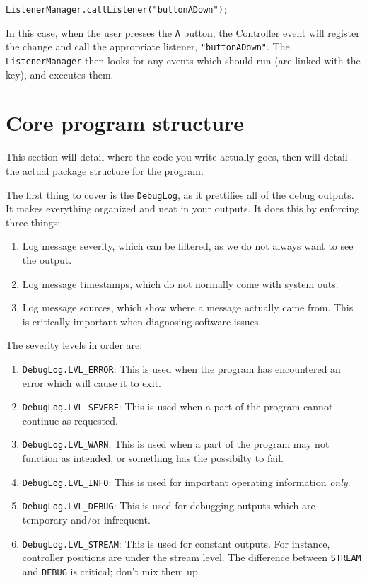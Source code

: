 \documentclass[a4paper]{article}
\begin{document}
\begin{lstlisting}
ListenerManager.callListener("buttonADown");
\end{lstlisting}

In this case, when the user presses the \lstinline{A} button, the Controller event will register the change and call the appropriate listener, \lstinline{"buttonADown"}. The \lstinline{ListenerManager} then looks for any events which should run (are linked with the key), and executes them.


\section{Core program structure}
This section will detail where the code you write actually goes, then will detail the actual package structure for the program.\newline

The first thing to cover is the \lstinline{DebugLog}, as it prettifies all of the debug outputs. It makes everything organized and neat in your outputs. It does this by enforcing three things:
\begin{enumerate}\item{Log message severity, which can be filtered, as we do not always want to see the output.}\item{Log message timestamps, which do not normally come with system outs.}\item{Log message sources, which show where a message actually came from. This is critically important when diagnosing software issues.}\end{enumerate}

\noindent The severity levels in order are:

\begin{enumerate}\item{\lstinline{DebugLog.LVL_ERROR}: This is used when the program has encountered an error which will cause it to exit.}\item{\lstinline{DebugLog.LVL_SEVERE}: This is used when a part of the program cannot continue as requested.}\item{\lstinline{DebugLog.LVL_WARN}: This is used when a part of the program may not function as intended, or something has the possibilty to fail.}\item{\lstinline{DebugLog.LVL_INFO}: This is used for important operating information \textit{only}.}\item{\lstinline{DebugLog.LVL_DEBUG}: This is used for debugging outputs which are temporary and/or infrequent.}\item{\lstinline{DebugLog.LVL_STREAM}: This is used for constant outputs. For instance, controller positions are under the stream level. The difference between \lstinline{STREAM} and \lstinline{DEBUG} is critical; don't mix them up.}\end{enumerate}
\end{document}
